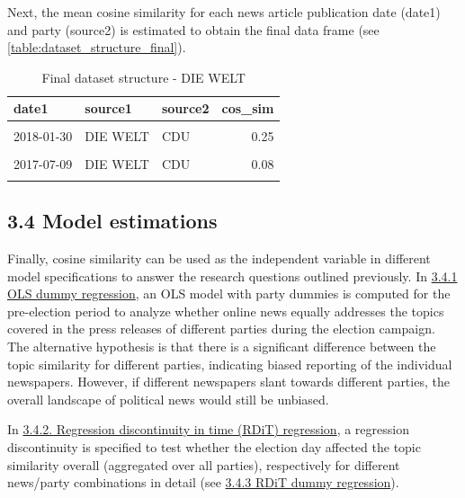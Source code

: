 \documentclass[
  12pt,
]{article}
\begin{document}
Next, the mean cosine similarity for each news article publication date
(date1) and party (source2) is estimated to obtain the final data frame
(see \autoref{table:dataset_structure_final}).

\begin{table}[H]

\caption{\label{tab:Dataset structure final}Final dataset structure - DIE WELT \label{table:dataset_structure_final}}
\centering
\fontsize{7}{9}\selectfont
\begin{tabular}[t]{lllr}
\toprule
date1 & source1 & source2 & cos\_sim\\
\midrule
\cellcolor{gray!6}{2017-10-07} & \cellcolor{gray!6}{DIE WELT} & \cellcolor{gray!6}{FDP} & \cellcolor{gray!6}{0.16}\\
2018-01-30 & DIE WELT & CDU & 0.25\\
\cellcolor{gray!6}{2017-10-26} & \cellcolor{gray!6}{DIE WELT} & \cellcolor{gray!6}{CDU} & \cellcolor{gray!6}{0.16}\\
2017-07-09 & DIE WELT & CDU & 0.08\\
\cellcolor{gray!6}{2017-12-05} & \cellcolor{gray!6}{DIE WELT} & \cellcolor{gray!6}{SPD} & \cellcolor{gray!6}{0.14}\\
\bottomrule
\end{tabular}
\end{table}

\hypertarget{model-estimations}{%
\subsection{3.4 Model estimations}\label{model-estimations}}

Finally, cosine similarity can be used as the independent variable in
different model specifications to answer the research questions outlined
previously. In \protect\hyperlink{ols-dummy-regression}{3.4.1 OLS dummy
regression}, an OLS model with party dummies is computed for the
pre-election period to analyze whether online news equally addresses the
topics covered in the press releases of different parties during the
election campaign. The alternative hypothesis is that there is a
significant difference between the topic similarity for different
parties, indicating biased reporting of the individual newspapers.
However, if different newspapers slant towards different parties, the
overall landscape of political news would still be unbiased.

In \protect\hyperlink{rdit}{3.4.2. Regression discontinuity in time
(RDiT) regression}, a regression discontinuity is specified to test
whether the election day affected the topic similarity overall
(aggregated over all parties), respectively for different news/party
combinations in detail (see \protect\hyperlink{rdit-dummy}{3.4.3 RDiT
dummy regression}).
\end{document}
